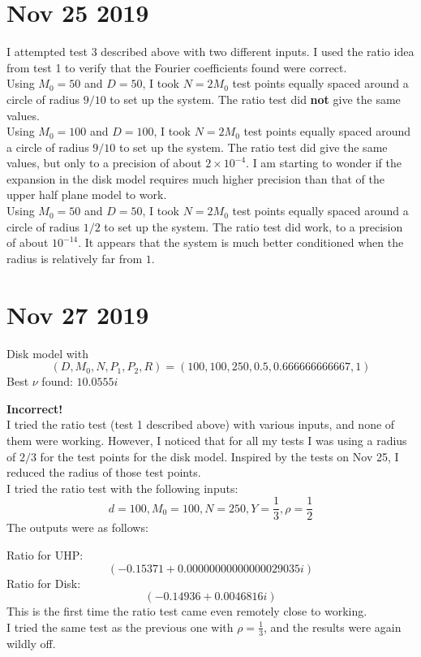\documentclass[]{article}
\begin{document}
	\section*{Nov 25 2019}
	
	I attempted test 3 described above with two different inputs.
	I used the ratio idea from test 1 to verify that the Fourier coefficients found were correct.
	\\
	
	Using $M_0 = 50$ and $D = 50$, I took $N = 2M_0$ test points equally spaced around a circle of radius $9/10$ to set up the system.
	The ratio test did \textbf{not} give the same values.
	\\
	
	Using $M_0 = 100$ and $D = 100$, I took $N = 2M_0$ test points equally spaced around a circle of radius $9/10$ to set up the system.
	The ratio test did give the same values, but only to a precision of about $2\times 10^{-4}$.
	I am starting to wonder if the expansion in the disk model requires much higher precision than that of the upper half plane model to work.
	\\
	
	Using $M_0 = 50$ and $D = 50$, I took $N = 2M_0$ test points equally spaced around a circle of radius $1/2$ to set up the system.
	The ratio test did work, to a precision of about $10^{-14}$.
	It appears that the system is much better conditioned when the radius is relatively far from $1$.
	
	\section*{Nov 27 2019}
	
	Disk model with
	$$
	(D, M_0, N, P_1, P_2, R) =
	( 100,100,250,0.5,0.666666666667,1 )
	$$
	Best $\nu$ found: $10.0555i$
	
	\textbf{Incorrect!}
	\\
	
	I tried the ratio test (test 1 described above) with various inputs, and none of them were working.
	However, I noticed that for all my tests I was using a radius of $2/3$ for the test points for the disk model.
	Inspired by the tests on Nov 25, I reduced the radius of those test points.
	\\
	
	I tried the ratio test with the following inputs:
	$$
	d = 100, M_0 = 100, N = 250, Y = \frac{1}{3}, \rho = \frac{1}{2}
	$$
	The outputs were as follows:
	
	Ratio for UHP:
	$$
	(-0.15371 + 0.00000000000000029035i)
	$$
	Ratio for Disk:
	$$
	(-0.14936 + 0.0046816i)
	$$
	This is the first time the ratio test came even remotely close to working.
	\\
	
	I tried the same test as the previous one with $\rho = \frac{1}{3}$, and the results were again wildly off.
	
\end{document}
